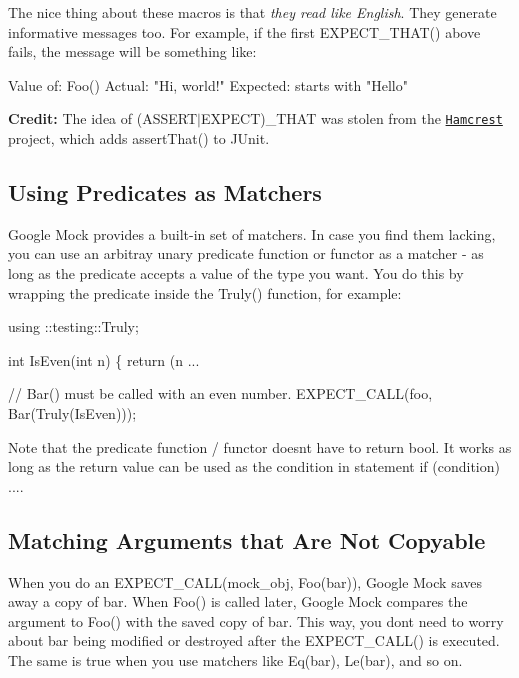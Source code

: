The nice thing about these macros is that {\itshape they read like English}. They generate informative messages too. For example, if the first {\ttfamily E\+X\+P\+E\+C\+T\+\_\+\+T\+H\+A\+T()} above fails, the message will be something like\+:


\begin{DoxyCode}
Value of: Foo()
  Actual: "Hi, world!"
Expected: starts with "Hello"
\end{DoxyCode}


{\bfseries Credit\+:} The idea of {\ttfamily (A\+S\+S\+E\+R\+T$\vert$\+E\+X\+P\+E\+CT)\+\_\+\+T\+H\+AT} was stolen from the \href{https://github.com/hamcrest/}{\tt Hamcrest} project, which adds {\ttfamily assert\+That()} to J\+Unit.

\subsection*{Using Predicates as Matchers}

Google Mock provides a built-\/in set of matchers. In case you find them lacking, you can use an arbitray unary predicate function or functor as a matcher -\/ as long as the predicate accepts a value of the type you want. You do this by wrapping the predicate inside the {\ttfamily Truly()} function, for example\+:


\begin{DoxyCode}
using ::testing::Truly;

\textcolor{keywordtype}{int} IsEven(\textcolor{keywordtype}{int} n) \{ \textcolor{keywordflow}{return} (n %
...

  \textcolor{comment}{// Bar() must be called with an even number.}
  EXPECT\_CALL(foo, Bar(Truly(IsEven)));
\end{DoxyCode}


Note that the predicate function / functor doesn\textquotesingle{}t have to return {\ttfamily bool}. It works as long as the return value can be used as the condition in statement {\ttfamily if (condition) ...}.

\subsection*{Matching Arguments that Are Not Copyable}

When you do an {\ttfamily E\+X\+P\+E\+C\+T\+\_\+\+C\+A\+L\+L(mock\+\_\+obj, Foo(bar))}, Google Mock saves away a copy of {\ttfamily bar}. When {\ttfamily Foo()} is called later, Google Mock compares the argument to {\ttfamily Foo()} with the saved copy of {\ttfamily bar}. This way, you don\textquotesingle{}t need to worry about {\ttfamily bar} being modified or destroyed after the {\ttfamily E\+X\+P\+E\+C\+T\+\_\+\+C\+A\+L\+L()} is executed. The same is true when you use matchers like {\ttfamily Eq(bar)}, {\ttfamily Le(bar)}, and so on.


